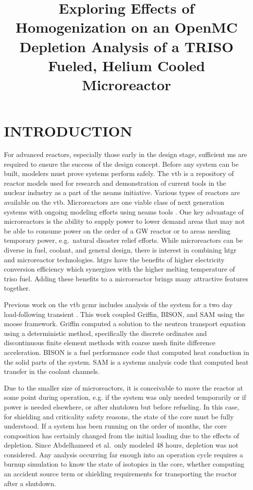 \documentclass[letterpaper]{physor2024}
\title{Exploring Effects of Homogenization on an OpenMC Depletion Analysis of a TRISO Fueled, Helium Cooled Microreactor}
\begin{document}
\section{INTRODUCTION}\label{sec:intro}
For advanced reactors, especially those early in the design stage, sufficient \gls{ms} are required to ensure the success of the design concept. Before any system can be built, modelers must prove systems perform safely. The \gls{vtb} \cite{vtb2023} is a repository of reactor models used for research and demonstration of current tools in the nuclear industry as a part of the \gls{neams} initiative. Various types of reactors are available on the \gls{vtb}. Microreactors are one viable class of next generation systems with ongoing modeling efforts using \gls{neams} tools \cite{Stauff-preliminary-applications-2021, Stauff-applications-2022, Abdelhameed-ANS-2022}. One key advantage of microreactors is the ability to supply power to lower demand areas that may not be able to consume power on the order of a GW reactor or to areas needing temporary power, e.g.~natural disaster relief efforts. While microreactors can be diverse in fuel, coolant, and general design, there is interest in combining \gls{htgr} and microreactor technologies. \glspl{htgr} have the benefits of higher electricity conversion efficiency which synergizes with the higher melting temperature of \gls{triso} fuel. Adding these benefits to a microreactor brings many attractive features together.

Previous work on the \gls{vtb} \gls{gcmr} includes analysis of the system for a two day load-following transient \cite{Abdelhameed-ANS-2022}. This work coupled Griffin, BISON, and SAM using the \gls{moose} framework. Griffin computed a solution to the neutron transport equation using a deterministic method, specifically the discrete ordinates and discontinuous finite element methods with coarse mesh finite difference acceleration. BISON is a fuel performance code that computed heat conduction in the solid parts of the system. SAM is a systems analysis code that computed heat transfer in the coolant channels.

Due to the smaller size of microreactors, it is conceivable to move the reactor at some point during operation, e.g. if the system was only needed temporarily or if power is needed elsewhere, or after shutdown but before refueling. In this case, for shielding and criticality safety reasons, the state of the core must be fully understood. If a system has been running on the order of months, the core composition has certainly changed from the initial loading due to the effects of depletion. Since Abdelhameed et al.~only modeled 48 hours, depletion was not considered. Any analysis occurring far enough into an operation cycle requires a burnup simulation to know the state of isotopics in the core, whether computing an accident source term or shielding requirements for transporting the reactor after a shutdown.
\end{document}
